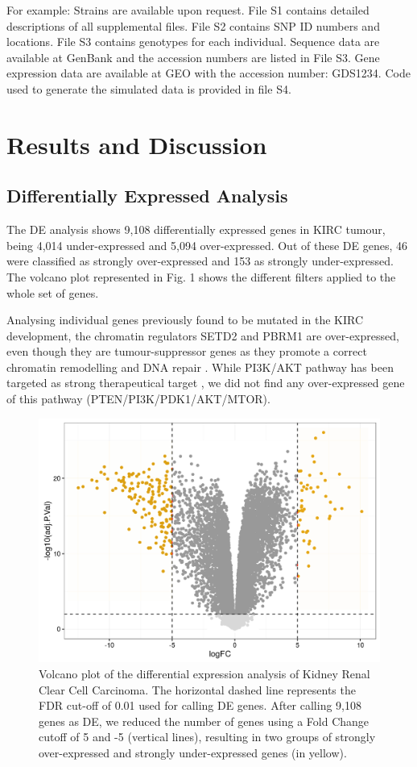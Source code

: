 \documentclass[9pt,twocolumn,twoside]{gsajnl}
\begin{document}
For example: Strains are available upon request. File S1 contains detailed descriptions of all supplemental files. File S2 contains SNP ID numbers and locations. File S3 contains genotypes for each individual. Sequence data are available at GenBank and the accession numbers are listed in File S3. Gene expression data are available at GEO with the accession number: GDS1234. Code used to generate the simulated data is provided in file S4. 


\section*{Results and Discussion}
\subsection*{Differentially Expressed Analysis}
The DE analysis shows 9,108 differentially expressed genes in KIRC tumour, being 4,014 under-expressed and 5,094 over-expressed. Out of these DE genes, 46 were classified as strongly over-expressed and 153 as strongly under-expressed. The volcano plot represented in Fig. 1 shows the different filters applied to the whole set of genes.

Analysing individual genes previously found to be mutated in the KIRC development, the chromatin regulators SETD2 and PBRM1 are over-expressed, even though they are tumour-suppressor genes as they promote a correct chromatin remodelling and DNA repair \citep{Creighton2013, Kanu2015}. While PI3K/AKT pathway has been targeted as strong therapeutical target \citep{Creighton2013}, we did not find any over-expressed gene of this pathway (PTEN/PI3K/PDK1/AKT/MTOR).

\begin{figure}[htbp]
\centering
\includegraphics[width=\linewidth]{figures/fig1_volcano.png}
\caption{Volcano plot of the differential expression analysis of Kidney Renal Clear Cell Carcinoma. The horizontal dashed line represents the FDR cut-off of 0.01 used for calling DE genes. After calling 9,108 genes as DE, we reduced the number of genes using a Fold Change cutoff of 5 and -5 (vertical lines), resulting in two groups of strongly over-expressed and strongly under-expressed genes (in yellow). }%
\label{fig:spectrum}
\end{figure}
\end{document}
